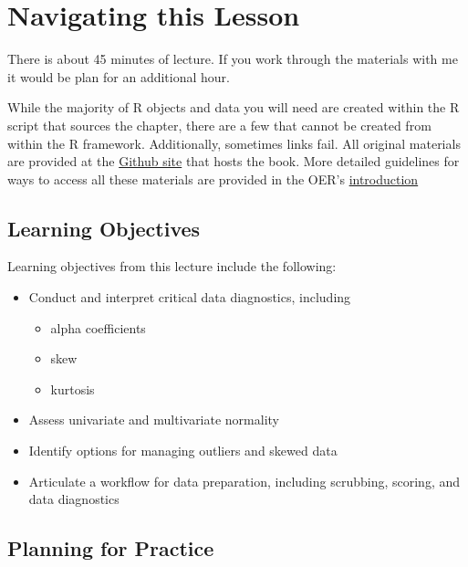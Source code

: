 \documentclass[
  11pt,
]{book}
\providecommand{\tightlist}{%
  \setlength{\itemsep}{0pt}\setlength{\parskip}{0pt}}
\begin{document}
\hypertarget{navigating-this-lesson-2}{%
\section{Navigating this Lesson}\label{navigating-this-lesson-2}}

There is about 45 minutes of lecture. If you work through the materials with me it would be plan for an additional hour.

While the majority of R objects and data you will need are created within the R script that sources the chapter, there are a few that cannot be created from within the R framework. Additionally, sometimes links fail. All original materials are provided at the \href{https://github.com/lhbikos/ReC_MultivModel}{Github site} that hosts the book. More detailed guidelines for ways to access all these materials are provided in the OER's \protect\hyperlink{ReCintro}{introduction}

\hypertarget{learning-objectives-2}{%
\subsection{Learning Objectives}\label{learning-objectives-2}}

Learning objectives from this lecture include the following:

\begin{itemize}
\tightlist
\item
  Conduct and interpret critical data diagnostics, including

  \begin{itemize}
  \tightlist
  \item
    alpha coefficients
  \item
    skew
  \item
    kurtosis
  \end{itemize}
\item
  Assess univariate and multivariate normality
\item
  Identify options for managing outliers and skewed data
\item
  Articulate a workflow for data preparation, including scrubbing, scoring, and data diagnostics
\end{itemize}

\hypertarget{planning-for-practice-2}{%
\subsection{Planning for Practice}\label{planning-for-practice-2}}
\end{document}
